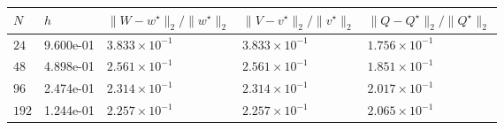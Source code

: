 \begin{tabular}{lllll}
\toprule
$N$ & $h$ & $\|W-w^\star\|_2/\|w^\star\|_2$ & $\|V-v^\star\|_2/\|v^\star\|_2$ & $\|Q-Q^\star\|_2/\|Q^\star\|_2$ \\
\midrule
\(24\) & 9.600e-01 & \(3.833\times10^{-1}\) & \(3.833\times10^{-1}\) & \(1.756\times10^{-1}\) \\
\(48\) & 4.898e-01 & \(2.561\times10^{-1}\) & \(2.561\times10^{-1}\) & \(1.851\times10^{-1}\) \\
\(96\) & 2.474e-01 & \(2.314\times10^{-1}\) & \(2.314\times10^{-1}\) & \(2.017\times10^{-1}\) \\
\(192\) & 1.244e-01 & \(2.257\times10^{-1}\) & \(2.257\times10^{-1}\) & \(2.065\times10^{-1}\) \\
\bottomrule
\end{tabular}
